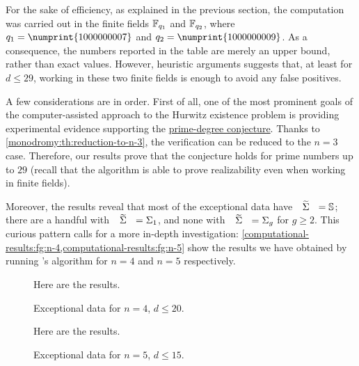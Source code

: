 \bgroup
{}
\egroup

\begin{remark}
For the sake of efficiency, as explained in the previous section, the computation was carried out in the finite fields $\mathbb{F}_{q_1}$ and $\mathbb{F}_{q_2}$, where $q_1=\numprint{1000000007}$ and $q_2=\numprint{1000000009}$. As a consequence, the numbers reported in the table are merely an upper bound, rather than exact values. However, heuristic arguments suggests that, at least for $d\le 29$, working in these two finite fields is enough to avoid any false positives.
\end{remark}

A few considerations are in order. First of all, one of the most prominent goals of the computer-assisted approach to the Hurwitz existence problem is providing experimental evidence supporting the \hyperref[prime-degree-conjecture]{prime-degree conjecture}. Thanks to \cref{monodromy:th:reduction-to-n-3}, the verification can be reduced to the $n=3$ case. Therefore, our results prove that the conjecture holds for prime numbers up to $29$ (recall that the algorithm is able to prove realizability even when working in finite fields).

Moreover, the results reveal that most of the exceptional data have $\tSigma=\sphere{}$; there are a handful with $\tSigma=\surf{1}$, and none with $\tSigma=\surf{g}$ for $g\ge 2$. This curious pattern calls for a more in-depth investigation: \cref{computational-results:fg:n-4,computational-results:fg:n-5} show the results we have obtained by running \citeauthor{zheng}'s algorithm for $n=4$ and $n=5$ respectively.

\begin{figure}[h]
Here are the results.
\caption{Exceptional data for $n=4$, $d\le 20$.}
\label{computational-results:fg:n-4}
\end{figure}
\begin{figure}[h]
Here are the results.
\caption{Exceptional data for $n=5$, $d\le 15$.}
\label{computational-results:fg:n-5}
\end{figure}

